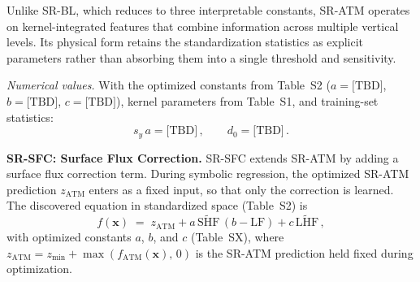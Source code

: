 Unlike SR-BL, which reduces to three interpretable constants, SR-ATM operates
on kernel-integrated features that combine information across multiple
vertical levels. Its physical form retains the standardization statistics as
explicit parameters rather than absorbing them into a single threshold
and sensitivity.

\vspace{0.3em}
\noindent\textit{Numerical values.}  With the optimized constants from
Table~S2 ($a = \text{[TBD]}$, $b = \text{[TBD]}$, $c = \text{[TBD]}$),
kernel parameters from Table~S1, and training-set statistics:
%
\begin{equation*}
  s_y\,a = \text{[TBD]}\,,\qquad
  d_0 = \text{[TBD]}\,.
\end{equation*}


\vspace{1.0em}
\textbf{SR-SFC: Surface Flux Correction.}
SR-SFC extends SR-ATM by adding a surface flux correction term.  During
symbolic regression, the optimized SR-ATM prediction $z_{\mathrm{ATM}}$
enters as a fixed input, so that only the correction is learned.  The
discovered equation in standardized space (Table~S2) is
%
\begin{equation}
  f(\mathbf{x}) \;=\; z_{\mathrm{ATM}}
    + a\,\widetilde{\mathrm{SHF}}\,(b - \mathrm{LF})
    + c\,\widetilde{\mathrm{LHF}}\,,
  \label{eq:s-srsfc-std}
\end{equation}
%
with optimized constants $a$, $b$, and $c$ (Table~SX), where
$z_{\mathrm{ATM}} = z_{\min} + \max(f_{\mathrm{ATM}}(\mathbf{x}),\,0)$ is
the SR-ATM prediction held fixed during optimization.

